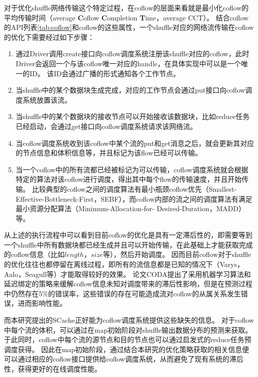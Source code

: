 对于优化shuffle网络传输这个特定过程，在coflow的层面来看就是最小化coflow的平均传输时间（average \textbf{C}oflow \textbf{C}ompletion \textbf{T}ime，average CCT）。
结合coflow的API列表\ref{tab:coflow}和coflow的这些属性，一个shuffle对应的网络流传输在coflow的优化下需要经过如下步骤：
\begin{enumerate}
	\item 通过Driver调用create接口向coflow调度系统注册该shuffle对应的coflow，此时Driver会返回一个与该coflow唯一对应的handle，在具体实现中可以是一个唯一的ID。
	该ID会通过广播的形式通知各个工作节点。
	\item 当shuffle中的某个数据块生成完成，对应的工作节点会通过put接口向coflow调度系统放置该流。
	\item 当shuffle中的某个数据块的接收节点可以开始接收该数据块，比如reduce任务已经启动，会通过get接口向coflow调度系统请求该网络流。
	\item 当coflow调度系统收到该coflow中某个流的put和get消息之后，就会更新其对应的节点信息和体积信息等，并且标记为该flow已经可以传输。
	\item 当一个coflow中的所有流都已经被标记为可以传输，coflow调度系统就会根据特定的算法对该coflow进行调度，得出其中每个flow的传输速度，并且开始传输。
	比较典型的coflow之间的调度算法有最小瓶颈coflow优先（Smallest-Effective-Bottleneck-First，SEBF）\cite{varys}，而coflow内部的流之间的调度算法有满足最小资源分配算法（Minimum-Allocation-for-
	Desired-Duration，MADD）\cite{varys}等。
\end{enumerate}

从上述的执行流程中可以看到目前coflow的优化是具有一定滞后性的，即需要等到一个shuffle中所有数据块都已经生成并且可以开始传输，在此基础上才能获取完成的coflow信息（比如$length$，$size$等），然后开始调度。
因而目前coflow对于shuffle的优化往往也都停留在离线过程，即所有的流信息都是已知的情况下（Varys\cite{varys}，Aalo\cite{aalo}，Seagull\cite{seagull}等）才能取得较好的效果。
论文CODA\cite{coda}提出了采用机器学习算法和延迟绑定的策略来缓解coflow信息未知对调度带来的滞后性影响，但是在预测过程中仍然存在5\%的错误率，这些错误的存在可能造成流对coflow的从属关系发生错误，进而影响性能。

而本研究提出的SCache正好能为coflow调度系统提供这些缺失的信息。
对于coflow中每个流的体积，可以通过在map初始阶段对shuffle输出数据分布的预测来获取。
于此同时，coflow中每个流的源节点和目的节点也可以通过启发式的reduce任务预调度获得。
因此在map初始阶段，通过结合本研究的优化策略获取的相关信息便可以通过相应的coflow接口提供给coflow调度系统，从而避免了现有系统的滞后性，获得更好的在线调度性能。

